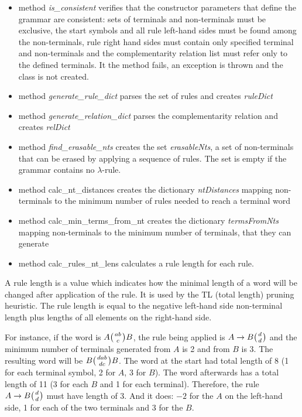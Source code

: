 \begin{itemize}
  \item{method \textit{is\_consistent} verifies that the constructor parameters that define the grammar are consistent: sets of terminals and non-terminals must be exclusive, the start symbols and all rule left-hand sides must be found among the non-terminals, rule right hand sides must contain only specified terminal and non-terminals and the complementarity relation list must refer only to the defined terminals. It the method fails, an exception is thrown and the class is not created.}

  \item{method \textit{generate\_rule\_dict} parses the set of rules and creates \textit{ruleDict}}

  \item{method \textit{generate\_relation\_dict} parses the complementarity relation and creates \textit{relDict}}

  \item{method \textit{find\_erasable\_nts} creates the set \textit{erasableNts}, a set of non-terminals that can be erased by applying a sequence of rules. The set is empty if the grammar contains no $\lambda$-rule.}

  \item{method calc\_nt\_distances creates the dictionary \textit{ntDistances} mapping non-terminals to the minimum number of rules needed to reach a terminal word}

  \item{method calc\_min\_terms\_from\_nt creates the dictionary \textit{termsFromNts} mapping non-terminals to the minimum number of terminals, that they can generate}

  \item{method calc\_rules\_nt\_lens calculates a rule length for each rule.}
\end{itemize}

A rule length is a value which indicates how the minimal length of a word will be changed after application of the rule. It is used by the TL (total length) pruning heuristic. The rule length is equal to the negative left-hand side non-terminal length plus lengths of all elements on the right-hand side.

For instance, if the word is $A \wkpair{ab}{c} B$, the rule being applied is $A \rightarrow B \wkpair{d}{d}$ and the minimum number of terminals generated from $A$ is 2 and from $B$ is 3. The resulting word will be $B \wkpair{dab}{dc} B$. The word at the start had total length of 8 (1 for each terminal symbol, 2 for $A$, 3 for $B$). The word afterwards has a total length of 11 (3 for each $B$ and 1 for each terminal). Therefore, the rule $A \rightarrow B \wkpair{d}{d}$ must have length of 3. And it does: $-2$ for the $A$ on the left-hand side, 1 for each of the two terminals and 3 for the $B$.

